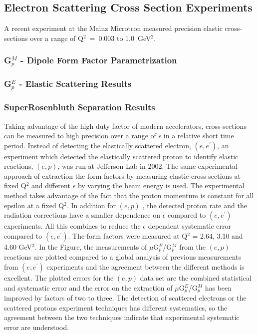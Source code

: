 \subsection{Electron Scattering Cross Section Experiments}
\label{subsec:xsection}

A recent experiment at the Mainz Microtron measured precision elastic cross-sections over a range of Q$^2$~=~0.003 to
1.0~GeV$^2$. 
\subsubsection{G$^M_p$ - Dipole Form Factor Parametrization}
\label{subsubsec:gmp}

\subsubsection{G$^E_p$ - Elastic Scattering Results}
\label{subsubsec:gep}

\subsubsection{SuperRosenbluth Separation Results}
\label{subsubsec:superrosen}
 Taking advantage of the high duty  factor of modern accelerators, cross-sections can be 
 measured to high precision over a range of $\epsilon$ in a relative short time period.
 Instead of detecting the elastically scattered electron, $(e,e^{\prime})$, an experiment 
 which detected the elastically scattered proton to
identify elastic reactions,  $(e,p)$, was run at Jefferson Lab in 2002. 
The same experimental approach of extraction the form factors by measuring elastic cross-sections
at fixed Q$^2$ and different $\epsilon$ by varying the beam energy is used. The experimental method takes advantage of the fact
that the proton momentum is constant for all epsilon at a fixed Q$^2$. 
In addition for  $(e,p)$ , the detected proton rate and the radiation corrections 
have a smaller dependence on $\epsilon$ compared to  $(e,e^{\prime})$ experiments. 
All this combines to  reduce the $\epsilon$ dependent systematic error compared to $(e,e^{\prime})$.
The form factors were measured at Q$^2$ = 2.64, 3.10 and 4.60 GeV$^2$.
In the Figure, the measurements of $\mu$G$^E_p$/G$^M_p$ from the $(e,p)$ reactions are plotted compared to a global analysis of previous
measurements from $(e,e^{\prime})$ experiments and the agreement between the different methods is excellent. 
The plotted errors for the $(e,p)$ data set  are the combined statistical and systematic
error and the error on the extraction of $\mu$G$^E_p$/G$^M_p$ has been improved by factors of two to three. The detection
of scattered electrons or the scattered protons experiment techniques has different systematics, so the agreement between
the two techniques indicate that experimental systematic error are understood.

